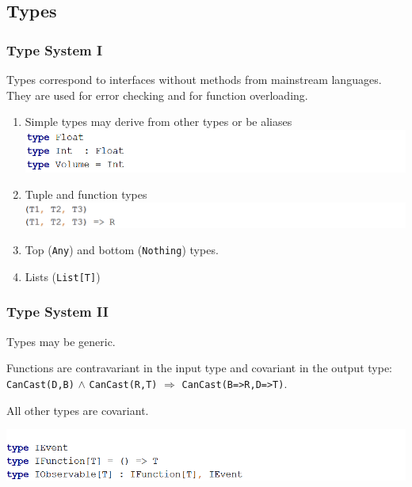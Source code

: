\documentclass{beamer}
\begin{document}
\subsection{Types}
\begin{frame}
\frametitle{Type System I}
Types correspond to interfaces without methods from mainstream languages. They are used for error checking and for function overloading.
\begin{enumerate}
  \item Simple types may derive from other types or be aliases
  \includegraphics[width=1\linewidth]{intfloat.png}
  \item Tuple and function types
  \includegraphics[width=1\linewidth]{tuplefunction.png}
  \item Top (\texttt{Any}) and bottom (\texttt{Nothing}) types.
  \item Lists (\texttt{List[T]})
\end{enumerate}
\end{frame}
\begin{frame}
\frametitle{Type System II}
Types may be generic.

Functions are contravariant in the input type and covariant in the output type: \texttt{CanCast(D,B)} $\wedge$ \texttt{CanCast(R,T)} $\Rightarrow$ \texttt{CanCast(B=>R,D=>T)}.

All other types are covariant.

\includegraphics[width=1\linewidth]{iobservable.png}

\end{frame}
\end{document}
